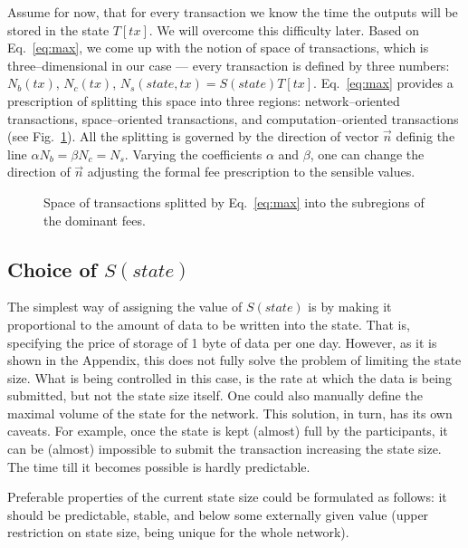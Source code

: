\documentclass[]{llncs}   %
\begin{document}
Assume for now, that for every transaction we know the time the outputs will be
stored in the state $T[tx]$. We will overcome this difficulty later. Based on
Eq.~\eqref{eq:max}, we come up with the notion of space of transactions, which
is three--dimensional in our case --- every transaction is defined by three
numbers: $N_b(tx)$, $N_c(tx)$, $N_s(state,tx) = S(state)T[tx]$. Eq.~\eqref{eq:max} provides a
prescription of splitting this space into three regions: network--oriented
transactions, space--oriented transactions, and computation--oriented
transactions (see Fig.~\ref{fig:max}). All the splitting is governed by the
direction of vector $\vec{n}$ definig the line $\alpha N_b=\beta N_c=N_s$.
Varying the coefficients $\alpha$ and $\beta$, one can change the direction of
$\vec{n}$ adjusting the formal fee prescription to the sensible values.
\begin{figure}
    \center
    
    \caption{Space of transactions splitted by
        Eq.~\eqref{eq:max} into the subregions of the dominant fees.\label{fig:max}}
\end{figure}

\subsection{Choice of $S(state)$}

The simplest way of assigning the value of $S(state)$ is by making it
proportional to the amount of data to be written into the state. That is,
specifying the price of storage of 1 byte of data per one day. However, as it is
shown in the Appendix, this does not fully solve the problem of limiting the
state size. What is being controlled in this case, is the rate at which the data
is being submitted, but not the state size itself. One could also manually
define the maximal volume of the state for the network. This solution, in turn,
has its own caveats. For example, once the state is kept (almost) full by the
participants, it can be (almost) impossible to submit the transaction increasing
the state size.  The time till it becomes possible is hardly predictable. 

Preferable properties of the current state size could be formulated as follows:
it should be predictable, stable, and below some externally given value (upper
restriction on state size, being unique for the whole network). 
\end{document}
